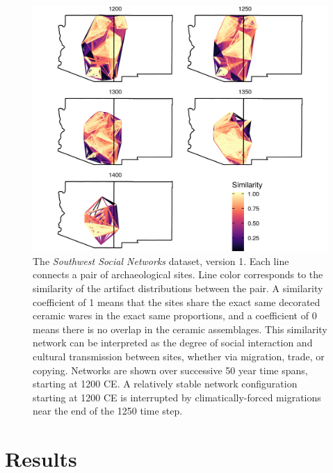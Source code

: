\documentclass[11pt]{wlscirep}
\begin{document}
\begin{figure}[!ht]
\centering
\includegraphics[width=.9\linewidth]{figures/JSD_network.png}
\caption{The \emph{Southwest Social Networks} dataset, version 1. Each line connects a pair of archaeological sites. Line color corresponds to the similarity of the artifact distributions between the pair. A similarity coefficient of 1 means that the sites share the exact same decorated ceramic wares in the exact same proportions, and a coefficient of 0 means there is no overlap in the ceramic assemblages. This similarity network can be interpreted as the degree of social interaction and cultural transmission between sites, whether via migration, trade, or copying. Networks are shown over successive 50 year time spans, starting at 1200 CE. A relatively stable network configuration starting at 1200 CE is interrupted by climatically-forced migrations near the end of the 1250 time step.}
\label{fig:network-plot}
\end{figure}


\section*{Results}
\end{document}
